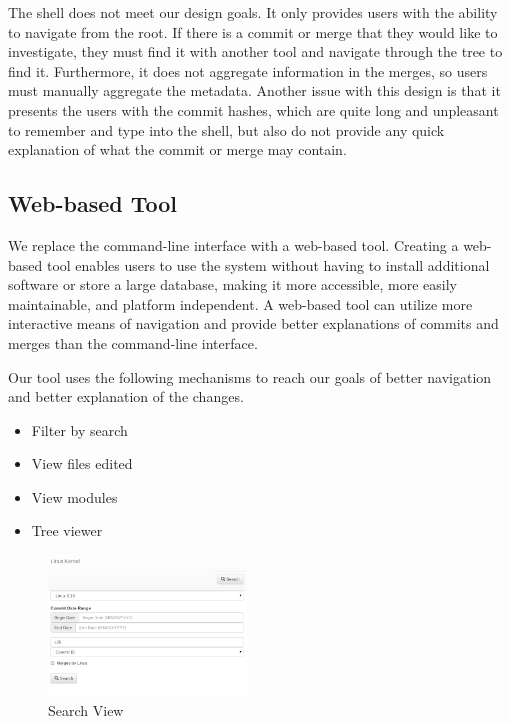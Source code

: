 \documentclass[conference, draftclsnofoot, draft]{IEEEtran}
\begin{document}
The shell does not meet our design goals. It only provides users with the ability to
navigate from the root. If there is a commit or merge that they would like to
investigate, they must find it with another tool and navigate through the tree to
find it. Furthermore, it does not aggregate information in the merges, so users must
manually aggregate the metadata. Another issue with this design is that it presents
the users with the commit hashes, which are quite long and unpleasant to remember
and type into the shell, but also do not provide any quick explanation of what the
commit or merge may contain.

\subsection{Web-based Tool}

We replace the command-line interface with a web-based tool. Creating a web-based
tool enables users to use the system without having to install additional software
or store a large database, making it more accessible, more easily maintainable, and
platform independent. A web-based tool can utilize more interactive means of
navigation and provide better explanations of commits and merges than the
command-line interface.

Our tool uses the following mechanisms to reach our goals of better navigation and
better explanation of the changes.

\begin{itemize}
        \item Filter by search
        \item View files edited
        \item View modules
        \item Tree viewer
\end{itemize}


\begin{figure}
        \centering
        \includegraphics[width=0.47\textwidth]{figures/search.png}
        \caption{Search View}
        \label{fig:search}
\end{figure}
\end{document}
